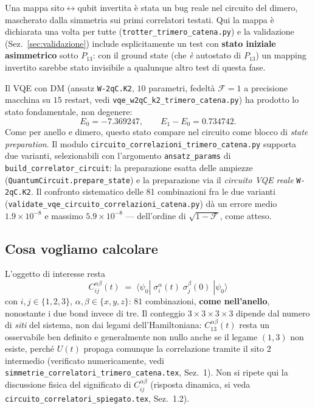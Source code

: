 \documentclass[11pt,a4paper]{article}
\begin{document}
\begin{warnbox}
Una mappa sito$\leftrightarrow$qubit invertita è stata un bug reale nel circuito del dimero,
mascherato dalla simmetria sui primi correlatori testati. Qui la mappa è dichiarata una volta per
tutte (\texttt{trotter\_trimero\_catena.py}) e la validazione (Sez.~\ref{sec:validazione}) include
esplicitamente un test con \textbf{stato iniziale asimmetrico} sotto $P_{13}$: con il ground state
(che \emph{è} autostato di $P_{13}$) un mapping invertito sarebbe stato invisibile a qualunque
altro test di questa fase.
\end{warnbox}

Il VQE con DM (ansatz \texttt{W-2qC.K2}, $10$ parametri, fedeltà $\mathcal F=1$ a precisione
macchina su $15$ restart, vedi \texttt{vqe\_w2qC\_k2\_trimero\_catena.py}) ha prodotto lo stato
fondamentale, non degenere:
\begin{equation}
E_0=-7.369247,\qquad E_1-E_0=0.734742.
\end{equation}
Come per anello e dimero, questo stato compare nel circuito come blocco di \emph{state
preparation}. Il modulo \texttt{circuito\_correlazioni\_trimero\_catena.py} supporta due varianti,
selezionabili con l'argomento \texttt{ansatz\_params} di \texttt{build\_correlator\_circuit}: la
preparazione esatta delle ampiezze (\texttt{QuantumCircuit.prepare\_state}) e la preparazione via
il \emph{circuito VQE reale} \texttt{W-2qC.K2}. Il confronto sistematico delle 81 combinazioni fra
le due varianti (\texttt{validate\_vqe\_circuito\_correlazioni\_catena.py}) dà un errore medio
$1.9\times10^{-8}$ e massimo $5.9\times10^{-8}$ --- dell'ordine di $\sqrt{1-\mathcal F}$, come
atteso.

\subsection{Cosa vogliamo calcolare}

L'oggetto di interesse resta
\begin{equation}
\boxed{\;C_{ij}^{\alpha\beta}(t) \;=\; \langle\psi_0|\;\sigma_i^\alpha(t)\;\sigma_j^\beta(0)\;|\psi_0\rangle\;}
\label{eq:Cdef}
\end{equation}
con $i,j\in\{1,2,3\}$, $\alpha,\beta\in\{x,y,z\}$: $81$ combinazioni, \textbf{come nell'anello},
nonostante i due bond invece di tre. Il conteggio $3\times3\times3\times3$ dipende dal numero di
\emph{siti} del sistema, non dai legami dell'Hamiltoniana: $C_{13}^{\alpha\beta}(t)$ resta un
osservabile ben definito e generalmente non nullo anche se il legame $(1,3)$ non esiste, perché
$U(t)$ propaga comunque la correlazione tramite il sito $2$ intermedio (verificato numericamente,
vedi \texttt{simmetrie\_correlatori\_trimero\_catena.tex}, Sez.~1). Non si ripete qui la
discussione fisica del significato di $C_{ij}^{\alpha\beta}$ (risposta dinamica, si veda
\texttt{circuito\_correlatori\_spiegato.tex}, Sez.~1.2).
\end{document}
